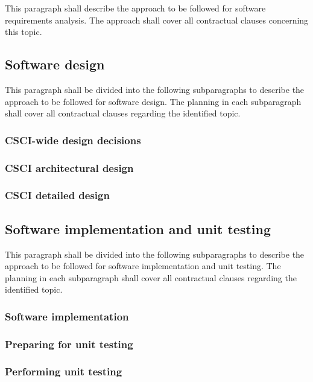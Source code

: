 \documentclass{fidata-report-template}
\begin{document}
This paragraph shall describe the approach to be followed for software
requirements analysis. The approach shall cover all contractual clauses
concerning this topic.

\subsection{Software design}

This paragraph shall be divided into the following subparagraphs to
describe the approach to be followed for software design. The planning
in each subparagraph shall cover all contractual clauses regarding the
identified topic.

\subsubsection{CSCI-wide design decisions}

\subsubsection{CSCI architectural design}

\subsubsection{CSCI detailed design}

\subsection{Software implementation and unit testing}

This paragraph shall be divided into the following subparagraphs to
describe the approach to be followed for software implementation and
unit testing. The planning in each subparagraph shall cover all
contractual clauses regarding the identified topic.

\subsubsection{Software implementation}

\subsubsection{Preparing for unit testing}

\subsubsection{Performing unit testing}
\end{document}
